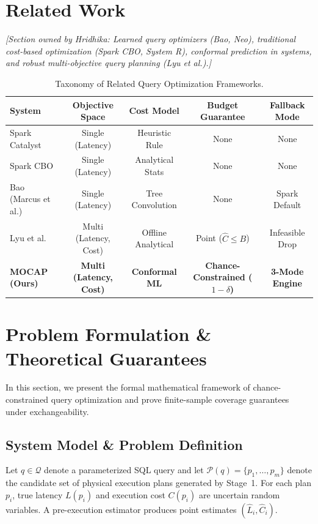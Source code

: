 \documentclass[journal,10pt,onecolumn]{article}
\begin{document}
\section{Related Work}
\label{sec:related_work}

\textit{[Section owned by Hridhika: Learned query optimizers (Bao, Neo), traditional cost-based optimization (Spark CBO, System R), conformal prediction in systems, and robust multi-objective query planning (Lyu et al.).]}

\begin{table}[h]
\centering
\small
\caption{Taxonomy of Related Query Optimization Frameworks.}
\label{tab:taxonomy}
\begin{tabularx}{\textwidth}{lcccc}
\toprule
\textbf{System} & \textbf{Objective Space} & \textbf{Cost Model} & \textbf{Budget Guarantee} & \textbf{Fallback Mode} \\
\midrule
Spark Catalyst & Single (Latency) & Heuristic Rule & None & None \\
Spark CBO & Single (Latency) & Analytical Stats & None & None \\
Bao (Marcus et al.) & Single (Latency) & Tree Convolution & None & Spark Default \\
Lyu et al. & Multi (Latency, Cost) & Offline Analytical & Point ($\hat{C} \le B$) & Infeasible Drop \\
\textbf{MOCAP (Ours)} & \textbf{Multi (Latency, Cost)} & \textbf{Conformal ML} & \textbf{Chance-Constrained ($1-\delta$)} & \textbf{3-Mode Engine} \\
\bottomrule
\end{tabularx}
\end{table}

\section{Problem Formulation \& Theoretical Guarantees}
\label{sec:theory}

In this section, we present the formal mathematical framework of chance-constrained query optimization and prove finite-sample coverage guarantees under exchangeability.

\subsection{System Model \& Problem Definition}
Let $q \in \mathcal{Q}$ denote a parameterized SQL query and let $\mathcal{P}(q) = \{p_1, \dots, p_m\}$ denote the candidate set of physical execution plans generated by Stage~1. For each plan $p_i$, true latency $L(p_i)$ and execution cost $C(p_i)$ are uncertain random variables. A pre-execution estimator produces point estimates $(\hat{L}_i, \hat{C}_i)$.
\end{document}

